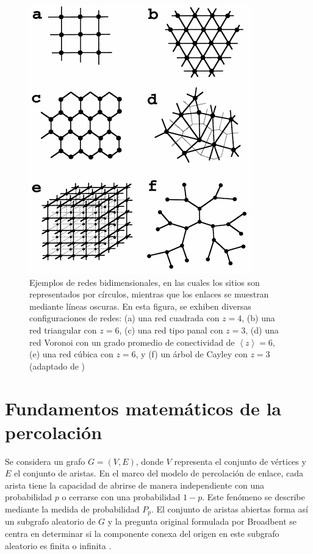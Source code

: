 \begin{figure}[h!]
	\centering\includegraphics[width=\imsize]{distitnasredes.png}
	\caption[Ejemplos de redes bidimensionales.]{ Ejemplos de redes bidimensionales, en las cuales los sitios son representados por círculos, mientras que los enlaces se muestran mediante líneas oscuras. En esta figura, se exhiben diversas configuraciones de redes: (a) una red cuadrada con  $z=4$, (b) una red triangular con  $z=6$, (c) una red tipo panal con $z=3$, (d) una red Voronoi con un grado promedio de conectividad de $\left\langle z \right\rangle = 6$, (e) una red cúbica con  $z=6$, y (f) un árbol de Cayley con  $z=3$ (adaptado de \protect\cite{berkowitz_percolation_1998})}\label{fig:distitnasredes}
\end{figure}






\section{Fundamentos matemáticos de la percolación}\label{sec:matematicaspercolacion}

Se considera un grafo $G=(V,E)$, donde $V$ representa el conjunto de vértices y $E$ el conjunto de aristas. En el marco del modelo de percolación de enlace, cada arista tiene la capacidad de abrirse de manera independiente con una probabilidad $p$ o cerrarse con una probabilidad $1-p$. Este fenómeno se describe mediante la medida de probabilidad $P_p$. El conjunto de aristas abiertas forma así un subgrafo aleatorio de $G$ y la pregunta original formulada por Broadbent se centra en determinar si la componente conexa del origen en este subgrafo aleatorio es finita o infinita \cite{beffara_percolation_2006}.



